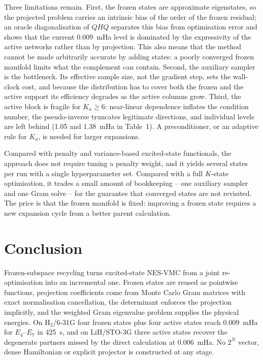 \documentclass[10pt,a4paper]{article}
\begin{document}
Three limitations remain. First, the frozen states are approximate eigenstates, so the projected problem carries an intrinsic bias of the order of the frozen residual; an oracle diagonalisation of $QHQ$ separates this bias from optimisation error and shows that the current 0.009~mHa level is dominated by the expressivity of the active networks rather than by projection. This also means that the method cannot be made arbitrarily accurate by adding states: a poorly converged frozen manifold limits what the complement can contain. Second, the auxiliary sampler is the bottleneck. Its effective sample size, not the gradient step, sets the wall-clock cost, and because the distribution has to cover both the frozen and the active support its efficiency degrades as the active columns grow. Third, the active block is fragile for $K_a\ge6$: near-linear dependence inflates the condition number, the pseudo-inverse truncates legitimate directions, and individual levels are left behind (1.05 and 1.38~mHa in Table~1). A preconditioner, or an adaptive rule for $K_a$, is needed for larger expansions.

Compared with penalty and variance-based excited-state functionals, the approach does not require tuning a penalty weight, and it yields several states per run with a single hyperparameter set. Compared with a full $K$-state optimisation, it trades a small amount of bookkeeping -- one auxiliary sampler and one Gram solve -- for the guarantee that converged states are not revisited. The price is that the frozen manifold is fixed: improving a frozen state requires a new expansion cycle from a better parent calculation.

\section{Conclusion}

Frozen-subspace recycling turns excited-state NES-VMC from a joint re-optimisation into an incremental one. Frozen states are reused as pointwise functions, projection coefficients come from Monte Carlo Gram matrices with exact normalisation cancellation, the determinant enforces the projection implicitly, and the weighted Gram eigenvalue problem supplies the physical energies. On H$_2$/6-31G four frozen states plus four active states reach $0.009$~mHa for $E_4$--$E_7$ in 425~s, and on LiH/STO-3G three active states recover the degenerate partners missed by the direct calculation at $0.006$~mHa. No $2^N$ vector, dense Hamiltonian or explicit projector is constructed at any stage.
\end{document}
